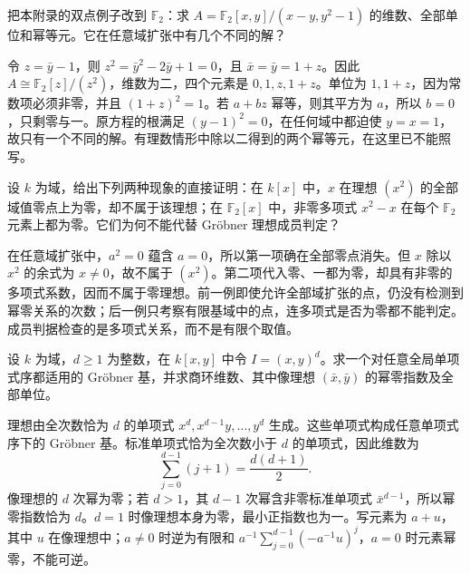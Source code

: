\begin{exercise}\label{b1:ex:F-characteristic-two-main}
	把本附录的双点例子改到 \(\mathbb F_2\)：求 \(A=\mathbb F_2[x,y]/(x-y,y^2-1)\) 的维数、全部单位和幂等元。它在任意域扩张中有几个不同的解？
\end{exercise}
\begin{solution}
	令 \(z=\bar y-1\)，则 \(z^2=\bar y^2-2\bar y+1=0\)，且 \(\bar x=\bar y=1+z\)。因此 \(A\cong\mathbb F_2[z]/(z^2)\)，维数为二，四个元素是 \(0,1,z,1+z\)。单位为 \(1,1+z\)，因为常数项必须非零，并且 \((1+z)^2=1\)。若 \(a+bz\) 幂等，则其平方为 \(a\)，所以 \(b=0\)，只剩零与一。原方程的根满足 \((y-1)^2=0\)，在任何域中都迫使 \(y=x=1\)，故只有一个不同的解。有理数情形中除以二得到的两个幂等元，在这里已不能照写。
\end{solution}

\begin{exercise}\label{b1:ex:F-points-not-membership}
	设 \(k\) 为域，给出下列两种现象的直接证明：在 \(k[x]\) 中，\(x\) 在理想 \((x^2)\) 的全部域值零点上为零，却不属于该理想；在 \(\mathbb F_2[x]\) 中，非零多项式 \(x^2-x\) 在每个 \(\mathbb F_2\) 元素上都为零。它们为何不能代替 Gröbner 理想成员判定？
\end{exercise}
\begin{solution}
	在任意域扩张中，\(a^2=0\) 蕴含 \(a=0\)，所以第一项确在全部零点消失。但 \(x\) 除以 \(x^2\) 的余式为 \(x\ne0\)，故不属于 \((x^2)\)。第二项代入零、一都为零，却具有非零的多项式系数，因而不属于零理想。前一例即使允许全部域扩张的点，仍没有检测到幂零关系的次数；后一例只考察有限基域中的点，连多项式是否为零都不能判定。成员判据检查的是多项式关系，而不是有限个取值。
\end{solution}

\begin{exercise}\label{b1:ex:F-truncated-total-degree}
	设 \(k\) 为域，\(d\ge1\) 为整数，在 \(k[x,y]\) 中令 \(I=(x,y)^d\)。求一个对任意全局单项式序都适用的 Gröbner 基，并求商环维数、其中像理想 \((\bar x,\bar y)\) 的幂零指数及全部单位。
\end{exercise}
\begin{solution}
	理想由全次数恰为 \(d\) 的单项式 \(x^d,x^{d-1}y,\ldots,y^d\) 生成。这些单项式构成任意单项式序下的 Gröbner 基。标准单项式恰为全次数小于 \(d\) 的单项式，因此维数为
	\[
		\sum_{j=0}^{d-1}(j+1)=\frac{d(d+1)}2.
	\]
	像理想的 \(d\) 次幂为零；若 \(d>1\)，其 \(d-1\) 次幂含非零标准单项式 \(\bar x^{d-1}\)，所以幂零指数恰为 \(d\)。\(d=1\) 时像理想本身为零，最小正指数也为一。写元素为 \(a+u\)，其中 \(u\) 在像理想中；\(a\ne0\) 时逆为有限和 \(a^{-1}\sum_{j=0}^{d-1}(-a^{-1}u)^j\)，\(a=0\) 时元素幂零，不能可逆。
\end{solution}

